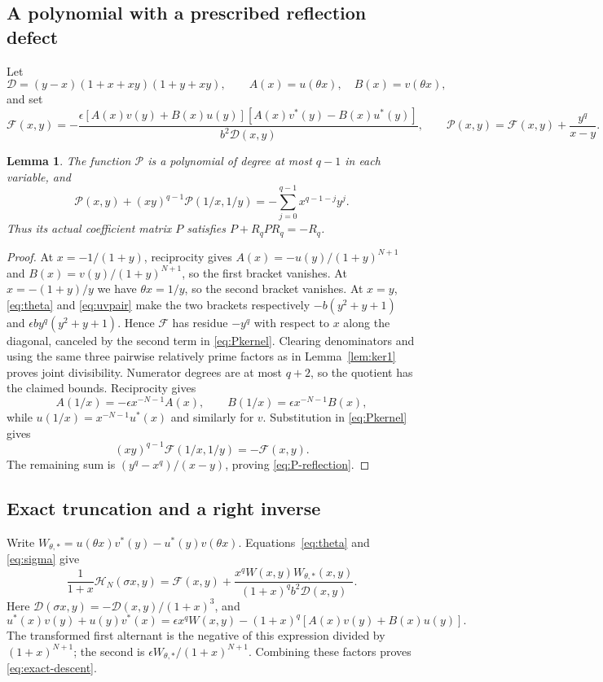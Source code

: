 \documentclass[11pt,a4paper]{amsart}
\newtheorem{lemma}[theorem]{Lemma}
\theoremstyle{remark}\newtheorem{remark}[theorem]{Remark}
\numberwithin{equation}{section}
\newcommand{\HH}{\mathscr H}
\newcommand{\PP}{\mathscr P}
\begin{document}
\subsection{A polynomial with a prescribed reflection defect}
Let
\[
 \mathscr D=(y-x)(1+x+xy)(1+y+xy),\qquad A(x)=u(\theta x),\quad B(x)=v(\theta x),
\]
and set
\begin{equation}\label{eq:Pkernel}
 \mathscr F(x,y)=-\frac{\epsilon[A(x)v(y)+B(x)u(y)]
 [A(x)v^*(y)-B(x)u^*(y)]}{b^2\mathscr D(x,y)},\qquad
 \PP(x,y)=\mathscr F(x,y)+\frac{y^q}{x-y}.
\end{equation}
\begin{lemma}\label{lem:Pkernel}
The function $\PP$ is a polynomial of degree at most $q-1$ in each variable, and
\begin{equation}\label{eq:P-reflection}
 \PP(x,y)+(xy)^{q-1}\PP(1/x,1/y)
 =-\sum_{j=0}^{q-1}x^{q-1-j}y^j.
\end{equation}
Thus its actual coefficient matrix $P$ satisfies $P+R_qPR_q=-R_q$.
\end{lemma}
\begin{proof}
At $x=-1/(1+y)$, reciprocity gives $A(x)=-u(y)/(1+y)^{N+1}$ and $B(x)=v(y)/(1+y)^{N+1}$, so the first bracket vanishes. At $x=-(1+y)/y$ we have $\theta x=1/y$, so the second bracket vanishes. At $x=y$, \eqref{eq:theta} and \eqref{eq:uvpair} make the two brackets respectively $-b(y^2+y+1)$ and $\epsilon by^q(y^2+y+1)$. Hence $\mathscr F$ has residue $-y^q$ with respect to $x$ along the diagonal, canceled by the second term in \eqref{eq:Pkernel}. Clearing denominators and using the same three pairwise relatively prime factors as in Lemma~\ref{lem:ker1} proves joint divisibility. Numerator degrees are at most $q+2$, so the quotient has the claimed bounds.
Reciprocity gives
\[
 A(1/x)=-\epsilon x^{-N-1}A(x),\qquad
 B(1/x)=\epsilon x^{-N-1}B(x),
\]
while $u(1/x)=x^{-N-1}u^*(x)$ and similarly for $v$. Substitution in \eqref{eq:Pkernel} gives
\[(xy)^{q-1}\mathscr F(1/x,1/y)=-\mathscr F(x,y).\] The remaining sum is $(y^q-x^q)/(x-y)$, proving \eqref{eq:P-reflection}.
\end{proof}

\subsection{Exact truncation and a right inverse}
Write $W_{\theta,*}=u(\theta x)v^*(y)-u^*(y)v(\theta x)$. Equations~\eqref{eq:theta} and \eqref{eq:sigma} give
\begin{equation}\label{eq:exact-descent}
 \frac1{1+x}\HH_N(\sigma x,y)=\mathscr F(x,y)
 +\frac{x^qW(x,y)W_{\theta,*}(x,y)}{(1+x)^qb^2\mathscr D(x,y)}.
\end{equation}
Here $\mathscr D(\sigma x,y)=-\mathscr D(x,y)/(1+x)^3$, and
\[
 u^*(x)v(y)+u(y)v^*(x)=\epsilon x^qW(x,y)
 -(1+x)^q[A(x)v(y)+B(x)u(y)].
\]
The transformed first alternant is the negative of this expression divided by $(1+x)^{N+1}$; the second is $\epsilon W_{\theta,*}/(1+x)^{N+1}$. Combining these factors proves \eqref{eq:exact-descent}.
\end{document}

